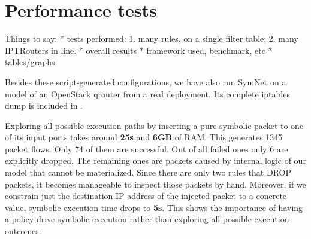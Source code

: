 \section{Performance tests}


Things to say:
* tests performed:
1. many rules, on a single filter table;
2. many IPTRouters in line.
* overall results
* framework used, benchmark, etc
* tables/graphs

\bigskip

Besides these script-generated configurations, we have also run SymNet on a
model of an OpenStack qrouter from a real deployment.  Its complete iptables
dump is included in .

Exploring all possible execution paths by inserting a pure symbolic packet to
one of its input ports takes around \textbf{25s} and \textbf{6GB} of RAM.  This
generates 1345 packet flows.  Only 74 of them are successful.  Out of all
failed ones only 6 are explicitly dropped.  The remaining ones are packets
caused by internal logic of our model that cannot be materialized.  Since there
are only two rules that DROP packets, it becomes manageable to inspect those
packets by hand.  Moreover, if we constrain just the destination IP address of
the injected packet to a concrete value, symbolic execution time drops to
\textbf{5s}.  This shows the importance of having a policy drive symbolic
execution rather than exploring all possible execution outcomes.
